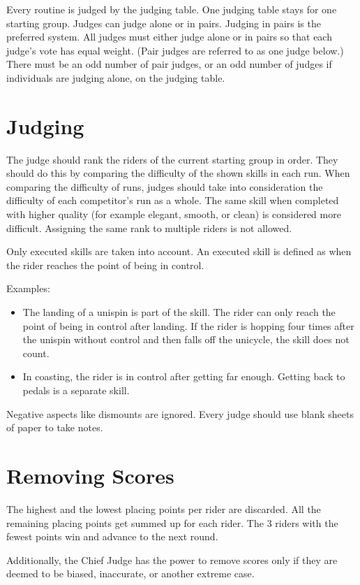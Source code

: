 Every routine is judged by the judging table.
One judging table stays for one starting group.
Judges can judge alone or in pairs.
Judging in pairs is the preferred system.
All judges must either judge alone or in pairs so that each judge's vote has equal weight.
(Pair judges are referred to as one judge below.)
There must be an odd number of pair judges, or an odd number of judges if individuals are judging alone, on the judging table. 

\section{Judging}

The judge should rank the riders of the current starting group in order.
They should do this by comparing the difficulty of the shown skills in each run.
When comparing the difficulty of runs, judges should take into consideration the difficulty of each competitor's run as a whole.
The same skill when completed with higher quality (for example elegant, smooth, or clean) is considered more difficult.
Assigning the same rank to multiple riders is not allowed.

Only executed skills are taken into account.
An executed skill is defined as when the rider reaches the point of being in control.

Examples:
\begin{itemize}
\item The landing of a unispin is part of the skill.
The rider can only reach the point of being in control after landing.
If the rider is hopping four times after the unispin without control and then falls off the unicycle, the skill does not count.
\item In coasting, the rider is in control after getting far enough.
Getting back to pedals is a separate skill.
\end{itemize}

Negative aspects like dismounts are ignored.
Every judge should use blank sheets of paper to take notes.

\section{Removing Scores}

The highest and the lowest placing points per rider are discarded.
All the remaining placing points get summed up for each rider.
The 3 riders with the fewest points win and advance to the next round.

Additionally, the Chief Judge has the power to remove scores only if they are deemed to be biased, inaccurate, or another extreme case.
